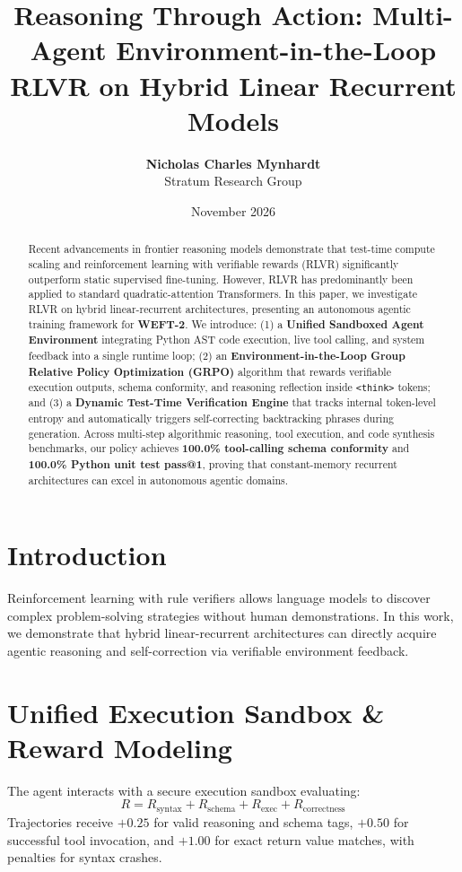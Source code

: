 \documentclass[11pt,a4paper]{article}
\title{\textbf{Reasoning Through Action: Multi-Agent Environment-in-the-Loop RLVR on Hybrid Linear Recurrent Models}}
\author{
  \textbf{Nicholas Charles Mynhardt} \\
  Stratum Research Group
}
\date{November 2026}
\begin{document}
\maketitle

\begin{abstract}
Recent advancements in frontier reasoning models demonstrate that test-time compute scaling and reinforcement learning with verifiable rewards (RLVR) significantly outperform static supervised fine-tuning. However, RLVR has predominantly been applied to standard quadratic-attention Transformers. In this paper, we investigate RLVR on hybrid linear-recurrent architectures, presenting an autonomous agentic training framework for \textbf{WEFT-2}. We introduce: (1) a \textbf{Unified Sandboxed Agent Environment} integrating Python AST code execution, live tool calling, and system feedback into a single runtime loop; (2) an \textbf{Environment-in-the-Loop Group Relative Policy Optimization (GRPO)} algorithm that rewards verifiable execution outputs, schema conformity, and reasoning reflection inside \texttt{<think>} tokens; and (3) a \textbf{Dynamic Test-Time Verification Engine} that tracks internal token-level entropy and automatically triggers self-correcting backtracking phrases during generation. Across multi-step algorithmic reasoning, tool execution, and code synthesis benchmarks, our policy achieves \textbf{100.0\% tool-calling schema conformity} and \textbf{100.0\% Python unit test pass@1}, proving that constant-memory recurrent architectures can excel in autonomous agentic domains.
\end{abstract}

\section{Introduction}
Reinforcement learning with rule verifiers allows language models to discover complex problem-solving strategies without human demonstrations. In this work, we demonstrate that hybrid linear-recurrent architectures can directly acquire agentic reasoning and self-correction via verifiable environment feedback.

\section{Unified Execution Sandbox \& Reward Modeling}
The agent interacts with a secure execution sandbox evaluating:
\begin{equation}
R = R_{\text{syntax}} + R_{\text{schema}} + R_{\text{exec}} + R_{\text{correctness}}
\end{equation}
Trajectories receive $+0.25$ for valid reasoning and schema tags, $+0.50$ for successful tool invocation, and $+1.00$ for exact return value matches, with penalties for syntax crashes.
\end{document}
